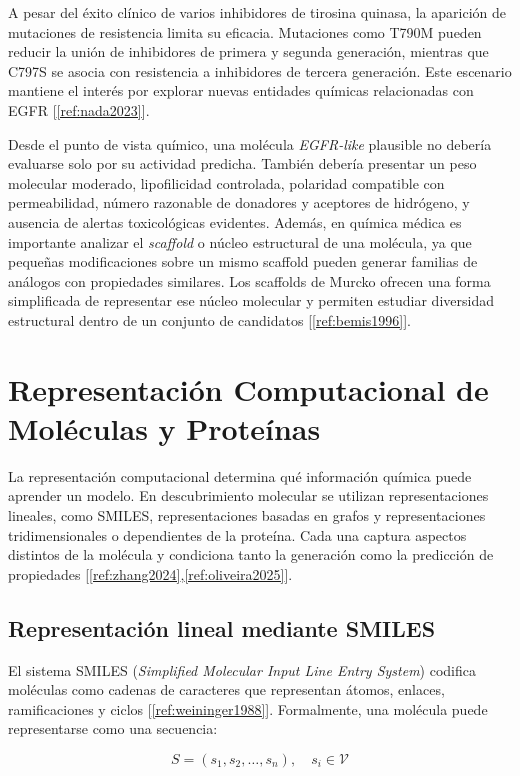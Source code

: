 \documentclass[IB]{TFUOC}%
\begin{document}
A pesar del éxito clínico de varios inhibidores de tirosina quinasa, la aparición de mutaciones de resistencia limita su eficacia. Mutaciones como T790M pueden reducir la unión de inhibidores de primera y segunda generación, mientras que C797S se asocia con resistencia a inhibidores de tercera generación. Este escenario mantiene el interés por explorar nuevas entidades químicas relacionadas con EGFR [\ref{ref:nada2023}].

Desde el punto de vista químico, una molécula \textit{EGFR-like} plausible no debería evaluarse solo por su actividad predicha. También debería presentar un peso molecular moderado, lipofilicidad controlada, polaridad compatible con permeabilidad, número razonable de donadores y aceptores de hidrógeno, y ausencia de alertas toxicológicas evidentes. Además, en química médica es importante analizar el \textit{scaffold} o núcleo estructural de una molécula, ya que pequeñas modificaciones sobre un mismo scaffold pueden generar familias de análogos con propiedades similares. Los scaffolds de Murcko ofrecen una forma simplificada de representar ese núcleo molecular y permiten estudiar diversidad estructural dentro de un conjunto de candidatos [\ref{ref:bemis1996}].

\section{Representación Computacional de Moléculas y Proteínas}

La representación computacional determina qué información química puede aprender un modelo. En descubrimiento molecular se utilizan representaciones lineales, como SMILES, representaciones basadas en grafos y representaciones tridimensionales o dependientes de la proteína. Cada una captura aspectos distintos de la molécula y condiciona tanto la generación como la predicción de propiedades [\ref{ref:zhang2024},\ref{ref:oliveira2025}].

\subsection{Representación lineal mediante SMILES}

El sistema SMILES (\textit{Simplified Molecular Input Line Entry System}) codifica moléculas como cadenas de caracteres que representan átomos, enlaces, ramificaciones y ciclos [\ref{ref:weininger1988}]. Formalmente, una molécula puede representarse como una secuencia:

\begin{equation}
S = (s_1, s_2, \dots, s_n), \quad s_i \in \mathcal{V}
\end{equation}
\end{document}
